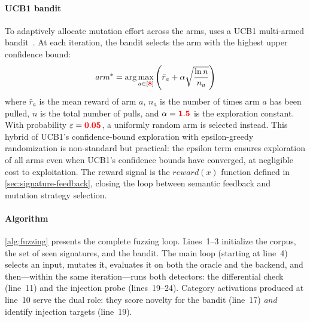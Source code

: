 \paragraph{UCB1 bandit}
To adaptively allocate mutation effort across the  arms, \tool uses a UCB1 multi-armed bandit~\cite{ucb1}. At each iteration, the bandit selects the arm with the highest upper confidence bound:
\[
\mathit{arm}^* = \arg\max_{a \in [{{\color{red}{{{\bf 8}}}}}]} \left( \bar{r}_a + \alpha \sqrt{\frac{\ln n}{n_a}} \right)
\]
where $\bar{r}_a$ is the mean reward of arm $a$, $n_a$ is the number of times arm $a$ has been pulled, $n$ is the total number of pulls, and $\alpha = {{\color{red}{{{\bf 1.5}}}}}$ is the exploration constant. With probability $\varepsilon = {{\color{red}{{{\bf 0.05}}}}}$, a uniformly random arm is selected instead. This hybrid of UCB1's confidence-bound exploration with epsilon-greedy randomization is non-standard but practical: the epsilon term ensures exploration of all arms even when UCB1's confidence bounds have converged, at negligible cost to exploitation. The reward signal is the $\mathit{reward}(x)$ function defined in \autoref{sec:signature-feedback}, closing the loop between semantic feedback and mutation strategy selection.

\paragraph{Algorithm}
\autoref{alg:fuzzing} presents the complete fuzzing loop. Lines~1--3 initialize the corpus, the set of seen signatures, and the bandit. The main loop (starting at line~4) selects an input, mutates it, evaluates it on both the oracle and the backend, and then---within the same iteration---runs both detectors: the differential check (line~11) and the injection probe (lines~19--24). Category activations produced at line~10 serve the dual role: they score novelty for the bandit (line~17) \emph{and} identify injection targets (line~19).

